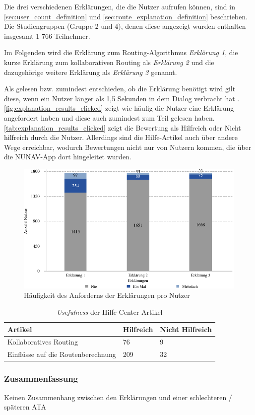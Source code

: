Die drei verschiedenen Erklärungen, die die Nutzer aufrufen können, sind in \autoref{sec:user_count_definition} und \autoref{sec:route_explanation_definition} beschrieben. Die Studiengruppen (Gruppe 2 und 4), denen diese angezeigt wurden enthalten insgesamt 1 766 Teilnehmer.

Im Folgenden wird die Erklärung zum Routing-Algorithmus \textit{Erklärung 1}, die kurze Erklärung zum kollaborativen Routing als \textit{Erklärung 2} und die dazugehörige weitere Erklärung als \textit{Erklärung 3} genannt.

Als gelesen bzw. zumindest entschieden, ob die Erklärung benötigt wird gilt diese, wenn ein Nutzer länger als 1,5 Sekunden in dem Dialog verbracht hat \cite{BAHR2011776}. \autoref{fig:explanation_results_clicked} zeigt wie häufig die Nutzer eine Erklärung angefordert haben und diese auch zumindest zum Teil gelesen haben. \autoref{tab:explanation_results_clicked} zeigt die Bewertung als \glqq Hilfreich\grqq{} oder \glqq Nicht hilfreich\grqq{} durch die Nutzer. Allerdings sind die Hilfe-Artikel auch über andere Wege erreichbar, wodurch Bewertungen nicht nur von Nutzern kommen, die über die NUNAV-App dort hingeleitet wurden.

\begin{figure}
    \centering
    \includegraphics[width=\linewidth]{contents/06_model_evaluation/02_evaluation/res/explanation_results_clicked.pdf}
    \caption{Häufigkeit des Anforderns der Erklärungen pro Nutzer}
    \label{fig:explanation_results_clicked}
\end{figure}

\begin{table}
    \centering
    \begin{tabular}{p{}p{}p{}}
        \hline
        Artikel & Hilfreich & Nicht Hilfreich \\
        \toprule
        Kollaboratives Routing & 76 & 9 \\
        Einflüsse auf die Routenberechnung & 209 & 32 \\
        \bottomrule
    \end{tabular}
    \caption{\textit{Usefulness} der Hilfe-Center-Artikel}
    \label{tab:explanation_results_clicked}
\end{table}

\subsubsection{Zusammenfassung}


Keinen Zusammenhang zwischen den Erklärungen und einer schlechteren / späteren ATA